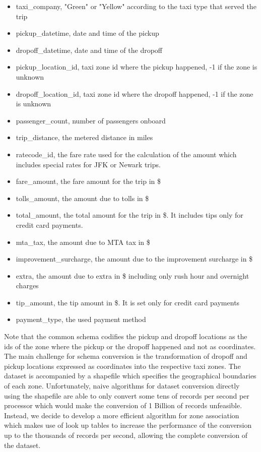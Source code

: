 \documentclass{acm_proc_article-sp-sigmod09}
\begin{document}
\begin{itemize}
	\item taxi\_company, "Green" or "Yellow" according to the taxi type that served the trip
	\item pickup\_datetime, date and time of the pickup
	\item dropoff\_datetime, date and time of the dropoff
	\item pickup\_location\_id, taxi zone id where the pickup happened, -1 if the zone is unknown
	\item dropoff\_location\_id, taxi zone id where the dropoff happened, -1 if the zone is unknown
	\item passenger\_count, number of passengers onboard
	\item trip\_distance, the metered distance in miles
	\item ratecode\_id, the fare rate used for the calculation of the amount which includes special rates for JFK or Newark trips.
	\item fare\_amount, the fare amount for the trip in \$
	\item tolls\_amount, the amount due to tolls in \$
	\item total\_amount, the total amount for the trip in \$. It includes tips only for credit card payments.
	\item mta\_tax, the amount due to MTA tax in \$
	\item improvement\_surcharge, the amount due to the improvement surcharge in \$
	\item extra, the amount due to extra in \$ including only rush hour and overnight charges
	\item tip\_amount, the tip amount in \$. It is set only for credit card payments
	\item payment\_type, the used payment method
\end{itemize}

Note that the common schema codifies the pickup and dropoff locations as the ids of the zone where the pickup or the dropoff happened and not as coordinates. The main challenge for schema conversion is the transformation of dropoff and pickup locations expressed as coordinates into the respective taxi zones. The dataset is accompanied by a shapefile which specifies the geographical boundaries of each zone. Unfortunately, naive algorithms for dataset conversion directly using the shapefile are able to only convert some tens of records per second per processor which would make the conversion of 1 Billion of records unfeasible. Instead, we decide to develop a more efficient algorithm for zone association which makes use of look up tables to increase the performance of the conversion up to the thousands of records per second, allowing the complete conversion of the dataset.
\end{document}
